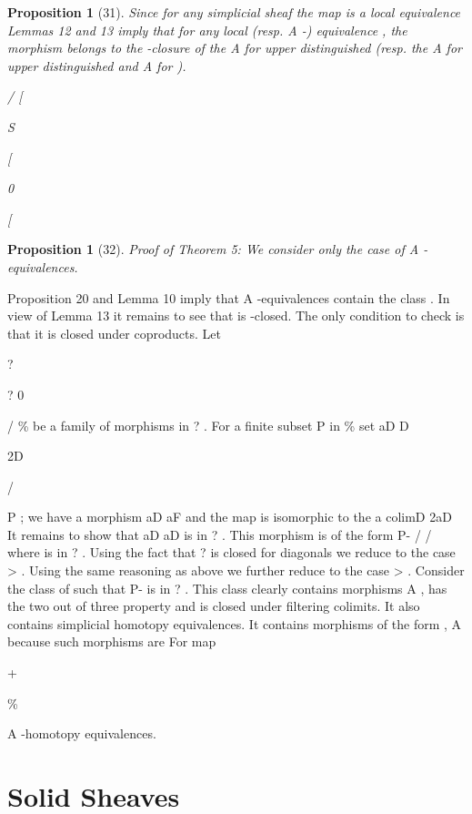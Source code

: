 \documentclass[11pt,a4paper]{article}
\theoremstyle{plain}
\newtheorem{proposition}[theorem]{Proposition}
\theoremstyle{definition}
\begin{document}
\begin{proposition}[31]
Since for any simplicial sheaf the map
is a local
equivalence Lemmas 12 and 13 imply that for any local (resp. A -) equivalence
, the morphism
belongs to the  -closure of the A
for upper distinguished (resp. the A
for upper distinguished and
 A
for 
).

 /
[


S 
 
 [





0

 

[



\end{proposition}

\begin{proposition}[32]
Proof of Theorem 5: We consider only the case of A -equivalences.
\end{proposition}

Proposition 20 and Lemma 10 imply that A -equivalences contain the class . In
view of Lemma 13 it remains to see that is  -closed. The only condition to check
is that it is closed under coproducts. Let

?

? 0

 /       \%
be a family of morphisms in ? . For a finite subset P in \% set
aD     
 D

 2D

/

P  ; we have a morphism aD aF and the map is isomorphic to the
a colimD 2aD
It remains to show that aD
aD  is in ? . This morphism is of the form
P-  / /  where  is in ? . Using the fact that ? is closed for diagonals we reduce to the case 
 >  . Using the same reasoning as above we
further reduce to the case 
 > .
Consider the class of  such that P-    is in ? . This class clearly contains morphisms  A 
 , has the two out of three property and is closed
under filtering colimits. It also contains simplicial homotopy equivalences. It contains morphisms of the form ,
  A  because such morphisms are
For
map

+

\%

A -homotopy equivalences.

\section{Solid Sheaves}
\end{document}
